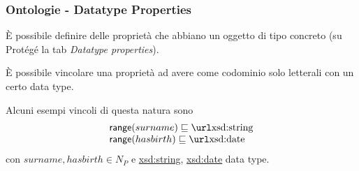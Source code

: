 \documentclass[8pt]{beamer}
\newcommand{\PNames}{N_P}
\begin{document}
\begin{frame}
 \frametitle{Ontologie - Datatype Properties}
 \`E possibile definire delle propriet\`a che abbiano un oggetto
 di tipo concreto (su Prot\'eg\'e la tab \emph{Datatype properties}).
 \vspace{\baselineskip}
 
 \`E possibile vincolare una propriet\`a  ad avere come codominio
 solo letterali con un certo data type. 
 \vspace{\baselineskip}
  
 Alcuni esempi vincoli di questa natura sono
 \[
 \begin{array}{l}
    \range(surname) \Issub \mathurl{xsd:string} \\
    \range(hasbirth) \Issub \mathurl{xsd:date}\\
 \end{array}
 \]
  con $surname, hasbirth \in \PNames$ e 
  \url{xsd:string}, \url{xsd:date} data type.
\end{frame}
\end{document}
